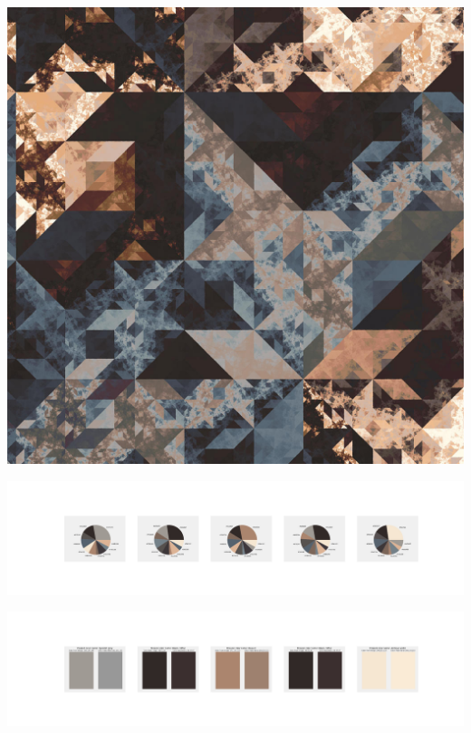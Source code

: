 \documentclass[11pt]{article}
\begin{document}
\begin{landscape}
    \begin{center}
    \includegraphics[width=\textwidth]{./nbimg/file (360).jpg}
    \end{center}

    \begin{center}
    \includegraphics[width=250mm]{./nbimg/pie-290.jpg}
    \end{center}

    \begin{center}
    \includegraphics[width=250mm]{./nbimg/peak-290.jpg}
    \end{center}
    


\end{landscape}
\end{document}
